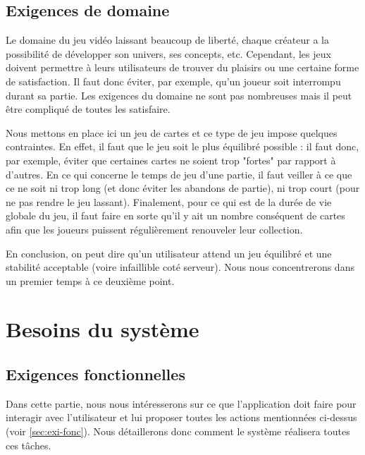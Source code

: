 \documentclass[11pt,a4paper]{article}
\begin{document}
\subsection{Exigences de domaine}
\label{sec:exi-dom}

Le domaine du jeu vidéo laissant beaucoup de liberté, chaque créateur a la possibilité de développer son univers, ses concepts, etc.  Cependant, les jeux doivent permettre à leurs utilisateurs de trouver du plaisirs ou une certaine forme de satisfaction.  Il faut donc éviter, par exemple, qu'un joueur soit interrompu durant sa partie.  Les exigences du domaine ne sont pas nombreuses mais il peut être compliqué de toutes les satisfaire.

\medbreak

Nous mettons en place ici un jeu de cartes et ce type de jeu impose quelques contraintes.  En effet, il faut que le jeu soit le plus équilibré possible : il faut donc, par exemple, éviter que certaines cartes ne soient trop "fortes" par rapport à d'autres.  En ce qui concerne le temps de jeu d'une partie, il faut veiller à ce que ce ne soit ni trop long (et donc éviter les abandons de partie), ni trop court (pour ne pas rendre le jeu lassant). Finalement, pour ce qui est de la durée de vie globale du jeu, il faut faire en sorte qu'il y ait un nombre conséquent de cartes afin que les joueurs puissent régulièrement renouveler leur collection.

\medbreak

En conclusion, on peut dire qu'un utilisateur attend un jeu équilibré et une stabilité acceptable (voire infaillible coté serveur).  Nous nous concentrerons dans un premier temps à ce deuxième point.



\section{Besoins du système}
\label{sec:besoins-sys}

\subsection{Exigences fonctionnelles}
\label{sec:exi-fonc-sys}

Dans cette partie, nous nous intéresserons sur ce que l'application doit
faire pour interagir avec l'utilisateur et lui proposer toutes les
actions mentionnées ci-dessus (voir \ref{sec:exi-fonc}). Nous détaillerons 
donc comment le système réalisera toutes ces tâches.
\end{document}
